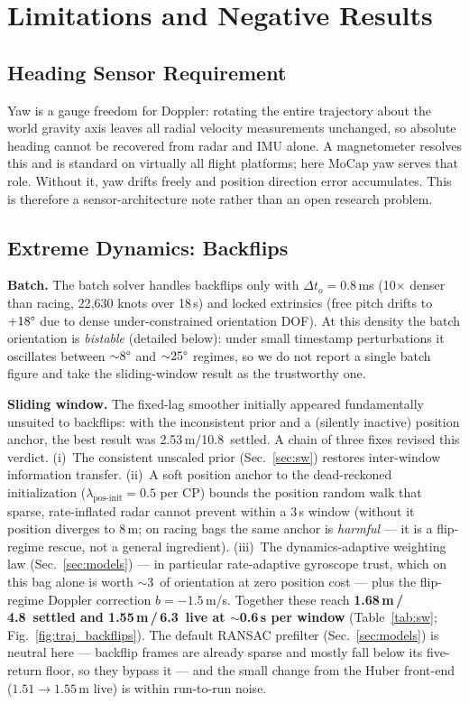 \documentclass[conference]{IEEEtran}
\begin{document}
\section{Limitations and Negative Results}
\label{sec:limits}

\subsection{Heading Sensor Requirement}
\label{sec:yaw}
Yaw is a gauge freedom for Doppler: rotating the entire trajectory
about the world gravity axis leaves all radial velocity measurements
unchanged, so absolute heading cannot be recovered from radar and IMU
alone.  A magnetometer resolves this and is standard on virtually all
flight platforms; here MoCap yaw serves that role.  Without it, yaw
drifts freely and position direction error accumulates.  This is
therefore a sensor-architecture note rather than an open research
problem.

\subsection{Extreme Dynamics: Backflips}
\label{sec:backflips}

\textbf{Batch.}
The batch solver handles backflips only with $\Delta t_o {=} 0.8$\,ms
(10$\times$ denser than racing, 22{,}630 knots over 18\,s) and
locked extrinsics (free pitch drifts to $+18\degree$ due to dense
under-constrained orientation DOF).  At this density the batch
orientation is \emph{bistable} (detailed below): under small
timestamp perturbations it oscillates between ${\sim}8\degree$ and
${\sim}25\degree$ regimes, so we do not report a single batch figure and
take the sliding-window result as the trustworthy one.

\textbf{Sliding window.}
The fixed-lag smoother initially appeared fundamentally unsuited to
backflips: with the inconsistent prior and a (silently inactive)
position anchor, the best result was 2.53\,m/10.8\degree\ settled.
A chain of three fixes revised this verdict.
(i)~The consistent unscaled prior (Sec.~\ref{sec:sw}) restores
inter-window information transfer.
(ii)~A soft position anchor to the dead-reckoned initialization
($\lambda_{\mathrm{pos\text{-}init}}{=}0.5$ per CP) bounds the
position random walk that sparse, rate-inflated radar cannot prevent
within a 3\,s window (without it position diverges to 8\,m; on racing
bags the same anchor is \emph{harmful} --- it is a flip-regime rescue,
not a general ingredient).
(iii)~The dynamics-adaptive weighting law (Sec.~\ref{sec:models}) ---
in particular rate-adaptive gyroscope trust, which on this bag alone
is worth $\sim$3\degree\ of orientation at zero position cost ---
plus the flip-regime Doppler correction $b{=}{-}1.5$\,m/s.
Together these reach \textbf{1.68\,m\,/\,4.8\degree\ settled and
1.55\,m\,/\,6.3\degree\ live at $\sim$0.6\,s per window}
(Table~\ref{tab:sw}; Fig.~\ref{fig:traj_backflips}).  The default RANSAC
prefilter (Sec.~\ref{sec:models})
is neutral here --- backflip frames are already sparse and mostly fall
below its five-return floor, so they bypass it --- and the small change
from the Huber front-end ($1.51\to1.55$\,m live) is within run-to-run
noise.
\end{document}
